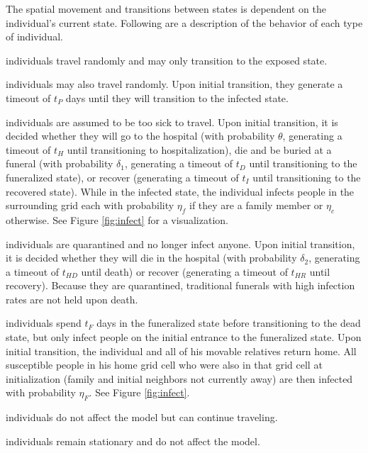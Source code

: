 The spatial movement and transitions between states is dependent on the individual's current state. Following are a description of the behavior of each type of individual.
\begin{description}[labelsep=1.5mm]
\setlength\itemsep{-3mm}
\item[Susceptible] individuals travel randomly and may only transition to the exposed state.\\
\item[Exposed] individuals may also travel randomly. Upon initial transition, they generate a timeout of $t_P$ days until they will transition to the infected state.\\
\item[Infected] individuals are assumed to be too sick to travel. Upon initial transition, it is decided whether they will go to the hospital (with probability $\theta$, generating a timeout of $t_H$ until transitioning to hospitalization), die and be buried at a funeral (with probability $\delta_1$, generating a timeout of $t_D$ until transitioning to the funeralized state), or recover (generating a timeout of $t_I$ until transitioning to the recovered state). While in the infected state, the individual infects people in the surrounding grid each with probability $\eta_f$ if they are a family member or $\eta_c$ otherwise. See Figure \ref{fig:infect} for a visualization.\\
\item[Hospitalized] individuals are quarantined and no longer infect anyone. Upon initial transition, it is decided whether they will die in the hospital (with probability $\delta_2$, generating a timeout of $t_{HD}$ until death) or recover (generating a timeout of $t_{HR}$ until recovery). Because they are quarantined, traditional funerals with high infection rates are not held upon death.\\
\item[Funeralized] individuals spend $t_F$ days in the funeralized state before transitioning to the dead state, but only infect people on the initial entrance to the funeralized state. Upon initial transition, the individual and all of his movable relatives return home. All susceptible people in his home grid cell who were also in that grid cell at initialization (family and initial neighbors not currently away) are then infected with probability $\eta_F$. See Figure \ref{fig:infect}.\\
\item[Recovered] individuals do not affect the model but can continue traveling.\\
\item[Dead] individuals remain stationary and do not affect the model.\\
\end{description}

